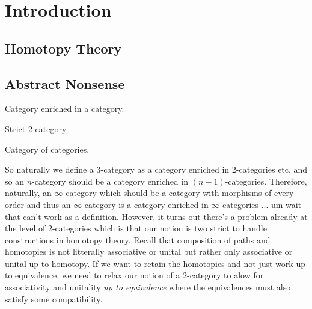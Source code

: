 \documentclass[12pt]{article}
\begin{document}
\section{Introduction}

\subsection{Homotopy Theory}

\subsection{Abstract Nonsense}

\newcommand{\C}{\mathcal{C}}
\newcommand{\Ob}{\mathrm{Ob}}

\begin{defn}
Category enriched in a category.
\end{defn}

\begin{defn}
Strict 2-category
\end{defn}

\begin{example}
Category of categories.
\end{example}

So naturally we define a 3-category as a category enriched in 2-categories etc. and so an $n$-category should be a category enriched in $(n-1)$-categories. Therefore, naturally, an $\infty$-category which should be a category with morphisms of every order and thus an $\infty$-category is a category enriched in $\infty$-categories ... um wait that can't work as a definition. However, it turns out there's a problem already at the level of $2$-categories which is that our notion is two strict to handle constructions in homotopy theory. Recall that composition of paths and homotopies is not litterally associative or unital but rather only associative or unital up to homotopy. If we want to retain the homotopies and not just work up to equivalence, we need to relax our notion of a $2$-category to alow for associativity and unitality \textit{up to equivalence} where the equivalences must also satisfy some compatibility. 
\end{document}
